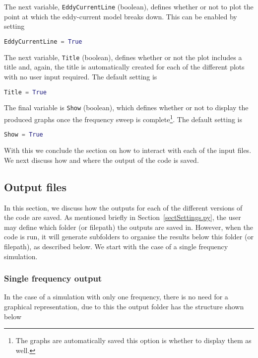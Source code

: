 The next variable, \texttt{EddyCurrentLine} (boolean), defines whether or not to plot the point at which the eddy-current model breaks down. This can be enabled by setting
\begin{lstlisting}[language=Python]
EddyCurrentLine = True
\end{lstlisting}
The next variable, \texttt{Title} (boolean), defines whether or not the plot includes a title and, again, the title is automatically created for each of the different plots with no user input required. The default setting is
\begin{lstlisting}[language=Python]
Title = True
\end{lstlisting}
The final variable is \texttt{Show} (boolean), which defines whether or not to display the produced graphs once the frequency sweep is complete\footnote{The graphs are automatically saved this option is whether to display them as well.}. The default setting is
\begin{lstlisting}[language=Python]
Show = True
\end{lstlisting}
With this we conclude the section on how to interact with each of the input files. We next discuss how and where the output of the code is saved.\\

\subsection{Output files}\label{sectOutput}
In this section, we discuss how the outputs for each of the different versions of the code are saved. As mentioned briefly in Section~\ref{sectSettings.py}, the user may define which folder (or filepath) the outputs are saved in. However, when the code is run, it will generate subfolders to organise the results below this folder (or filepath), as described below. We start with the case of a single frequency simulation.\\


\subsubsection{Single frequency output}
In the case of a simulation with only one frequency, there is no need for a graphical representation, due to this the output folder has the structure shown below %


